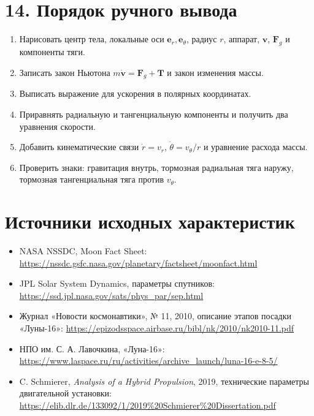\documentclass[11pt,a4paper]{article}
\newcommand{\er}{\mathbf e_r}
\newcommand{\etheta}{\mathbf e_\theta}
\newcommand{\vv}{\mathbf v}
\begin{document}
\section{14. Порядок ручного вывода}
\begin{enumerate}
\item Нарисовать центр тела, локальные оси $\er,\etheta$, радиус $r$, аппарат, $\vv$, $\mathbf F_g$ и компоненты тяги.
\item Записать закон Ньютона $m\dot{\vv}=\mathbf F_g+\mathbf T$ и закон изменения массы.
\item Выписать выражение для ускорения в полярных координатах.
\item Приравнять радиальную и тангенциальную компоненты и получить два уравнения скорости.
\item Добавить кинематические связи $\dot r=v_r$, $\dot\theta=v_\theta/r$ и уравнение расхода массы.
\item Проверить знаки: гравитация внутрь, тормозная радиальная тяга наружу, тормозная тангенциальная тяга против $v_\theta$.
\end{enumerate}

\section*{Источники исходных характеристик}
\begin{itemize}
\item NASA NSSDC, Moon Fact Sheet: \url{https://nssdc.gsfc.nasa.gov/planetary/factsheet/moonfact.html}
\item JPL Solar System Dynamics, параметры спутников: \url{https://ssd.jpl.nasa.gov/sats/phys_par/sep.html}
\item Журнал «Новости космонавтики», № 11, 2010, описание этапов посадки «Луны-16»: \url{https://epizodsspace.airbase.ru/bibl/nk/2010/nk2010-11.pdf}
\item НПО им. С. А. Лавочкина, «Луна-16»: \url{https://www.laspace.ru/ru/activities/archive_launch/luna-16-e-8-5/}
\item C. Schmierer, \textit{Analysis of a Hybrid Propulsion}, 2019, технические параметры двигательной установки: \url{https://elib.dlr.de/133092/1/2019%20Schmierer%20Dissertation.pdf}
\end{itemize}
\end{document}
